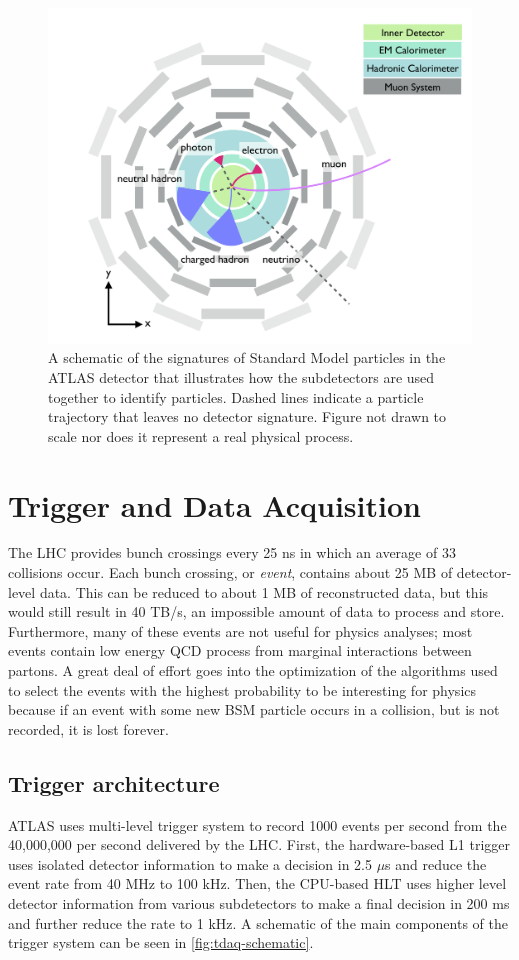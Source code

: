 \begin{figure}[htbp]
\centering
\includegraphics[width=.6\textwidth]{figures/Detector/particle-doodle.png}
\caption{A schematic of the signatures of Standard Model particles in the \ac{ATLAS} detector that illustrates how the subdetectors are used together to identify particles. Dashed lines indicate a particle trajectory that leaves no detector signature. Figure not drawn to scale nor does it represent a real physical process.}
\label{fig:particle-doodles}
\end{figure}


\section{Trigger and Data Acquisition}

The \ac{LHC} provides bunch crossings every 25 ns in which an average of 33 collisions occur. Each bunch crossing, or \emph{event}, contains about 25 MB of detector-level data. This can be reduced to about 1 MB of reconstructed data, but this would still result in 40 TB/s, an impossible amount of data to process and store. Furthermore, many of these events are not useful for physics analyses; most events contain low energy \ac{QCD} process from marginal interactions between partons. A great deal of effort goes into the optimization of the algorithms used to select the events with the highest probability to be interesting for physics because if an event with some new \ac{BSM} particle occurs in a collision, but is not recorded, it is lost forever.


\subsection{Trigger architecture}

\ac{ATLAS} uses multi-level trigger system to record 1000 events per second from the 40,000,000 per second delivered by the \ac{LHC}. First, the hardware-based \ac{L1} trigger uses isolated detector information to make a decision in 2.5 $\mu$s and reduce the event rate from 40 MHz to 100 kHz. Then, the CPU-based \ac{HLT} uses higher level detector information from various subdetectors to make a final decision in 200 ms and further reduce the rate to 1 kHz. A schematic of the main components of the trigger system can be seen in \autoref{fig:tdaq-schematic}.


